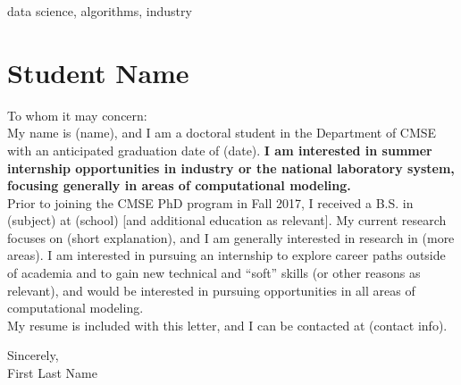  data science, algorithms, industry


\vspace{2em} %


\section{Student Name}


\label{sec:student_b} 


\setlength\parindent{0cm}

To whom it may concern:\\

My name is (name), and I am a doctoral student in the Department of CMSE with an anticipated graduation date of (date). {\textbf{I am interested in summer internship opportunities in industry or the national laboratory system, focusing generally in areas of computational modeling.}}\\

Prior to joining the CMSE PhD program in Fall 2017, I received a B.S. in (subject) at (school) [and additional education as relevant].  My current research focuses on (short explanation), and I am generally interested in research in (more areas).  I am interested in pursuing an internship to explore career paths outside of academia and to gain new technical and “soft” skills (or other reasons as relevant), and would be interested in pursuing opportunities in all areas of computational modeling.\\

My resume is included with this letter, and I can be contacted at (contact info).\\

\begin{flushright}
Sincerely, \\
\vspace{1em} 
\vspace{1em} 
First Last Name\\
\end{flushright}




%  

